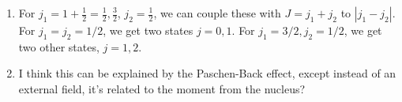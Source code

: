 \documentclass{homework}
\begin{document}
\begin{enumerate}
\begin{enumerate}
			\item For $j_1 = 1 + \frac{1}{2} = \frac{1}{2}, \frac{3}{2}$, $j_2 = \frac{1}{2}$, we can couple these with $J = j_1 + j_2$ to $|j_1 - j_2|$. For $j_1 = j_2 = 1/2$, we get two states $j=0, 1$. For $j_1 = 3/2, j_2 = 1/2$, we get two other states, $j=1, 2$.
			
			\item I think this can be explained by the Paschen-Back effect, except instead of an external field, it's related to the moment from the nucleus?
		\end{enumerate}
	\end{enumerate}
\end{document}
